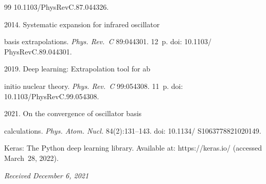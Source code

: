 {{\begin{thebibliography}{99}
10.1103\!/\!PhysRevC.87.044326.







 2014. Systematic expansion for infrared oscillator 


basis extrapolations. \textit{Phys. Rev.~C} 89:044301. 12~p. doi: 10.1103\!/ PhysRevC.89.044301.










 2019. Deep learning: Extrapolation tool for ab 


initio nuclear theory. \textit{Phys. Rev.~C} 99:054308. 11~p. doi: 10.1103\!/\!PhysRevC.99.054308.




 2021. On the convergence of oscillator basis 


calculations. \textit{Phys. Atom. Nucl.} 84(2):131--143. doi: 10.1134\!/ S1063778821020149.




Keras: The Python deep learning library. Available at: {\sf https://keras.io/} (accessed March~28, 2022).


\end{thebibliography}


} }





\vspace*{-3pt}





\hfill{\small\textit{Received December 6, 2021}} 










\Contr





\noindent


